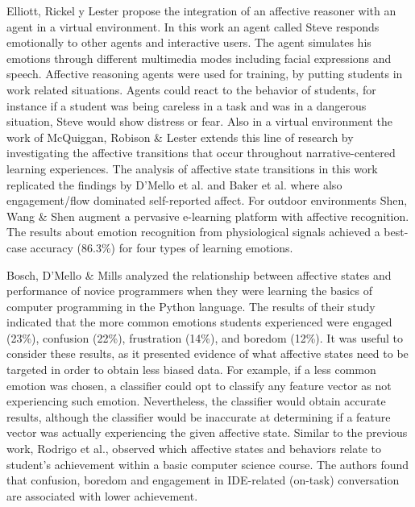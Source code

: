 \documentclass[a4paper]{llncs}
\begin{document}
Elliott, Rickel y Lester \cite{elliott1999lifelike,d2008autotutor} propose the integration of an affective reasoner
with an agent in a virtual environment. In this work an agent called Steve
responds emotionally to other agents and interactive users. The agent simulates
his emotions through different multimedia modes including facial expressions and
speech. Affective reasoning agents were used for training, by putting students
in work related situations. Agents could react to the behavior of students, for
instance if a student was being careless in a task and was in a dangerous
situation, Steve would show distress or fear. Also in a virtual environment the
work of McQuiggan, Robison \& Lester \cite{mcquiggan2010affective} extends this line of research by
investigating the affective transitions that occur throughout narrative-centered
learning experiences. The analysis of affective state transitions in this work
replicated the findings by D’Mello et al. \cite{d2008autotutor} and Baker et al. 
\cite{rodrigo2009affective} where
also engagement/flow dominated self-reported affect. For outdoor environments
Shen, Wang \& Shen \cite{shen2009affective} augment a pervasive e-learning platform with affective
recognition.  The results about emotion recognition from physiological signals
achieved a best-case accuracy (86.3\%) for four types of learning emotions.

Bosch, D'Mello \& Mills \cite{bosch2013emotions} analyzed the relationship between affective states
and performance of novice programmers when they were learning the basics of
computer programming in the Python language. The results of their study
indicated that the more common emotions students experienced were engaged
(23\%), confusion (22\%), frustration (14\%), and boredom (12\%). It was useful
to consider these results, as it presented evidence of what affective states
need to be targeted in order to obtain less biased data. For example, if a less
common emotion was chosen, a classifier could opt to classify any feature vector
as not experiencing such emotion. Nevertheless, the classifier would obtain
accurate results, although the classifier would be inaccurate at determining if
a feature vector was actually experiencing the given affective state. Similar to
the previous work, Rodrigo et al., \cite{rodrigo2009affective} observed which affective states and
behaviors relate to student's achievement within a basic computer science
course. The authors found that confusion, boredom and engagement in IDE-related
(on-task) conversation are associated with lower achievement.
\end{document}
